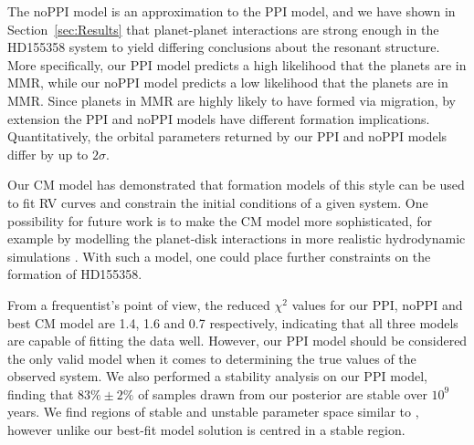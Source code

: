 The noPPI model is an approximation to the PPI model, and we have shown in Section~\ref{sec:Results} that planet-planet interactions are strong enough in the HD155358 system to yield differing conclusions about the resonant structure. 
More specifically, our PPI model predicts a high likelihood that the planets are in MMR, while our noPPI model predicts a low likelihood that the planets are in MMR. 
Since planets in MMR are highly likely to have formed via migration, by extension the PPI and noPPI models have different formation implications. 
Quantitatively, the orbital parameters returned by our PPI and noPPI models differ by up to $2\sigma$.

Our CM model has demonstrated that formation models of this style can be used to fit RV curves and constrain the initial conditions of a given system. 
One possibility for future work is to make the CM model more sophisticated, for example by modelling the planet-disk interactions in more realistic hydrodynamic simulations \citep{Rein2010}. 
With such a model, one could place further constraints on the formation of HD155358.

From a frequentist's point of view, the reduced $\chi^2$ values for our PPI, noPPI and best CM model are 1.4, 1.6 and 0.7 respectively, indicating that all three models are capable of fitting the data well.
However, our PPI model should be considered the only valid model when it comes to determining the true values of the observed system.
We also performed a stability analysis on our PPI model, finding that $83\% \pm 2\%$ of samples drawn from our posterior are stable over $10^9$ years.
We find regions of stable and unstable parameter space similar to \R, however unlike \R our best-fit model solution is centred in a stable region. 
